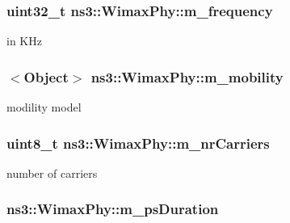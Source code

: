 \subsubsection[{\texorpdfstring{m\+\_\+frequency}{m_frequency}}]{\setlength{\rightskip}{0pt plus 5cm}uint32\+\_\+t ns3\+::\+Wimax\+Phy\+::m\+\_\+frequency\hspace{0.3cm}{\ttfamily [private]}}\hypertarget{classns3_1_1WimaxPhy_a9ff835622336fec214af2754fd9ee0cc}{}\label{classns3_1_1WimaxPhy_a9ff835622336fec214af2754fd9ee0cc}


in K\+Hz 

\subsubsection[{\texorpdfstring{m\+\_\+mobility}{m_mobility}}]{$<${\bf Object}$>$ ns3\+::\+Wimax\+Phy\+::m\+\_\+mobility\hspace{0.3cm}{\ttfamily [private]}}\hypertarget{classns3_1_1WimaxPhy_a308b3704d8db362c89d52d79c4ab0e04}{}\label{classns3_1_1WimaxPhy_a308b3704d8db362c89d52d79c4ab0e04}


modility model 

\subsubsection[{\texorpdfstring{m\+\_\+nr\+Carriers}{m_nrCarriers}}]{\setlength{\rightskip}{0pt plus 5cm}uint8\+\_\+t ns3\+::\+Wimax\+Phy\+::m\+\_\+nr\+Carriers\hspace{0.3cm}{\ttfamily [private]}}\hypertarget{classns3_1_1WimaxPhy_aa48c239218c08d5eb0975dfb628bcc20}{}\label{classns3_1_1WimaxPhy_aa48c239218c08d5eb0975dfb628bcc20}


number of carriers 

\subsubsection[{\texorpdfstring{m\+\_\+ps\+Duration}{m_psDuration}}]{ ns3\+::\+Wimax\+Phy\+::m\+\_\+ps\+Duration\hspace{0.3cm}{\ttfamily [private]}}\hypertarget{classns3_1_1WimaxPhy_a351d08e3a363ea71f26f7cf32bc330f3}{}\label{classns3_1_1WimaxPhy_a351d08e3a363ea71f26f7cf32bc330f3}


